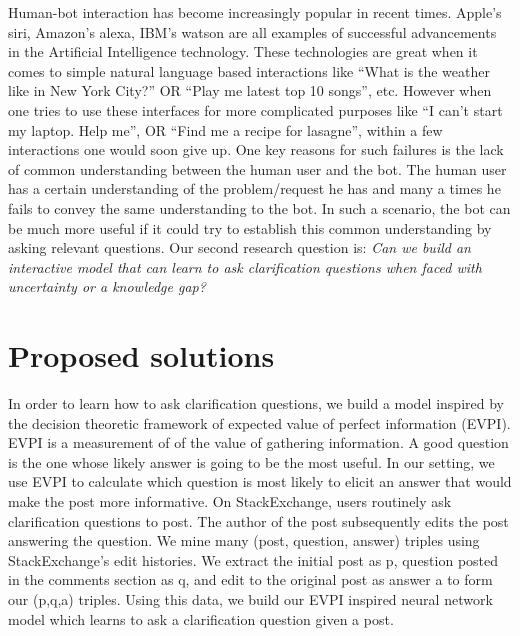 \documentclass[11pt]{report}
\numberwithin{equation}{section}
\begin{document}
\noindent
Human-bot interaction has become increasingly popular in recent times. Apple's siri, Amazon's alexa, IBM's watson are all examples of successful advancements in the Artificial Intelligence technology. These technologies are great when it comes to simple natural language based interactions like ``What is the weather like in New York City?'' OR ``Play me latest top 10 songs'', etc. However when one tries to use these interfaces for more complicated purposes like ``I can't start my laptop. Help me\!'', OR ``Find me a recipe for lasagne'', within a few interactions one would soon give up. One key reasons for such failures is the lack of common understanding between the human user and the bot. The human user has a certain understanding of the problem/request he has and many a times he fails to convey the same understanding to the bot. In such a scenario, the bot can be much more useful if it could try to establish this common understanding by asking relevant questions. Our second research question is: \textit{Can we build an interactive model that can learn to ask clarification questions when faced with uncertainty or a knowledge gap?}\\

\noindent

\section{Proposed solutions}

In order to learn how to ask clarification questions, we build a model inspired by the decision theoretic framework of expected value of perfect information (EVPI). EVPI is a measurement of of the value of gathering information. A good question is the one whose likely answer is going to be the most useful. In our setting, we use EVPI to calculate which question is most likely to elicit an answer that would make the post more informative. On StackExchange, users routinely ask clarification questions to post. The author of the post subsequently edits the post answering the question. We mine many (post, question, answer) triples using StackExchange's edit histories. We extract the initial post as p, question posted in the comments section as q, and edit to the original post as answer a to form our (p,q,a) triples. Using this data, we build our EVPI inspired neural network model which learns to ask a clarification question given a post.\\
\end{document}
